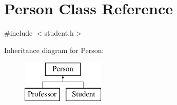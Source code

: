 \hypertarget{class_person}{}\section{Person Class Reference}
\label{class_person}


{\ttfamily \#include $<$student.\+h$>$}

Inheritance diagram for Person\+:\begin{figure}[H]
\begin{center}
\leavevmode
\includegraphics[height=2.000000cm]{class_person}
\end{center}
\end{figure}

